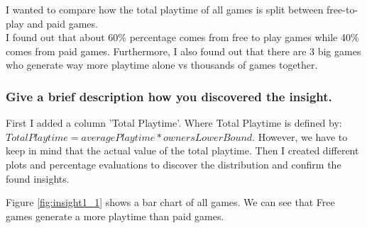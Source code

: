 \documentclass[11pt]{article}
\begin{document}
I wanted to compare how the total playtime of all games is split between free-to-play and paid games.\\
I found out that about 60\% percentage comes from free to play games while 40\% comes from paid games. Furthermore, I also found out that there are 3 big games who generate way more playtime alone vs thousands of games together. 

\subsubsection{Give a brief description how you discovered the
insight.}

First I added a column 'Total Playtime'. Where Total Playtime is defined by:
\smallbreak
$Total Playtime = average Playtime * owners Lower Bound.$
\smallbreak
However, we have to keep in mind that the actual value of the total playtime. 
Then I created different plots and percentage evaluations to discover the distribution and confirm the found insights. 

Figure \ref{fig:insight1_1} shows a bar chart of all games. We can see that Free games generate a more playtime than paid games.\\ 
\end{document}
